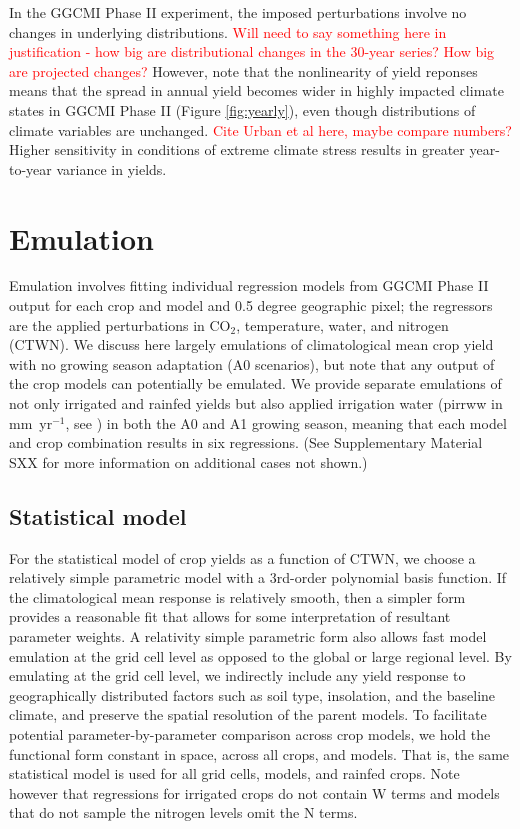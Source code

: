 \documentclass[gmd, manuscript]{copernicus} %
\begin{document}
In the GGCMI Phase II experiment, the imposed perturbations involve no changes in underlying distributions. %
\textcolor{red}{Will need to say something here in justification - how big are distributional changes in the 30-year series? How big are projected changes?}
However, note that the nonlinearity of yield reponses means that the spread in annual yield becomes wider in highly impacted climate states in GGCMI Phase II (Figure \ref{fig:yearly}), even though distributions of climate variables are unchanged.
\textcolor{red}{Cite Urban et al here, maybe compare numbers?}
Higher sensitivity in conditions of extreme climate stress results in greater year-to-year variance in yields.

\section{Emulation}
\label{S:3}
Emulation involves fitting individual regression models from GGCMI Phase II output for each crop and model and 0.5 degree geographic pixel; the regressors are the applied perturbations in CO$_2$, temperature, water, and nitrogen (CTWN). 
We discuss here largely emulations of climatological mean crop yield with no growing season adaptation (A0 scenarios), but note that any output of the crop models can potentially be emulated. 
We provide separate emulations of not only irrigated and rainfed yields but also applied irrigation water (pirrww in mm\ yr$^{-1}$, see \citep{franke2019ctwnexperiment}) in both the A0 and A1 growing season, meaning that each model and crop combination results in six regressions. (See Supplementary Material SXX for more information on additional cases not shown.)

\subsection{Statistical model}
For the statistical model of crop yields as a function of CTWN, we choose a relatively simple parametric model with a 3rd-order polynomial basis function. 
If the climatological mean response is relatively smooth, then a simpler form provides a reasonable fit that allows for some interpretation of resultant parameter weights. 
A relativity simple parametric form also allows fast model emulation at the grid cell level as opposed to the global or large regional level. 
By emulating at the grid cell level, we indirectly include any yield response to geographically distributed factors such as soil type, insolation, and the baseline climate, and preserve the spatial resolution of the parent models.
To facilitate potential parameter-by-parameter comparison across crop models, we hold the functional form constant in space, across all crops, and models. 
That is, the same statistical model is used for all grid cells, models, and rainfed crops. 
Note however that regressions for irrigated crops do not contain W terms and models that do not sample the nitrogen levels omit the N terms.
\end{document}
